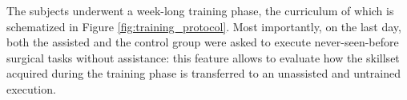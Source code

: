 \documentclass{article}
\newcommand{\cright}{\textsuperscript{\textregistered}\phantom{..}}
\begin{document}
\begin{multicols}{2}
The subjects underwent a week-long training phase, the curriculum of which is schematized in Figure \ref{fig:training_protocol}. Most importantly, on the last day, both the assisted and the control group were asked to execute never-seen-before surgical tasks without assistance: this feature allows to evaluate how the skillset acquired during the training phase is transferred to an unassisted and untrained execution.

\end{multicols}
\end{document}

